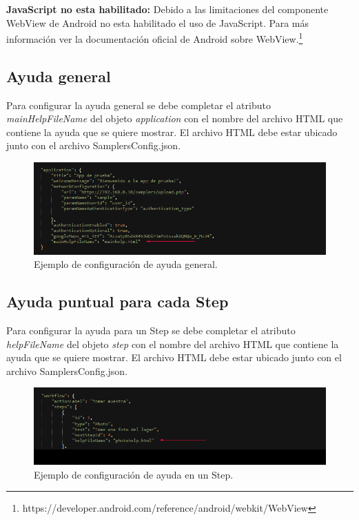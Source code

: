 \textbf{JavaScript no esta habilitado:} Debido a las limitaciones del componente WebView de Android no esta habilitado el uso de JavaScript. Para más información ver la documentación oficial de Android sobre WebView.\footnote{https://developer.android.com/reference/android/webkit/WebView}

\subsection{Ayuda general}
Para configurar la ayuda general se debe completar el atributo \textit{mainHelpFileName} del objeto \textit{application} con el nombre del archivo HTML que contiene la ayuda que se quiere mostrar. El archivo HTML debe estar ubicado junto con el archivo SamplersConfig.json.

\begin{figure}[H]
  \centering
    \includegraphics[scale=0.6]{50-anexos/B-uso/json_application_ayuda.png} 
    \caption{Ejemplo de configuración de ayuda general.}
\end{figure}	

\subsection{Ayuda puntual para cada Step}
Para configurar la ayuda para un Step se debe completar el atributo \textit{helpFileName} del objeto \textit{step} con el nombre del archivo HTML que contiene la ayuda que se quiere mostrar. El archivo HTML debe estar ubicado junto con el archivo SamplersConfig.json.

\begin{figure}[H]
  \centering
    \includegraphics[scale=0.6]{50-anexos/B-uso/json_step_ayuda.png} 
    \caption{Ejemplo de configuración de ayuda en un Step.}
\end{figure}	


